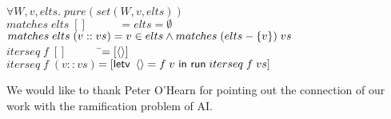 \documentclass[preprint,natbib]{sigplanconf}
\begin{document}
\begin{tabbing}
$\forall W, v, elts.\; pure(set(W,v,elts))$ \\[1em]
  

$matches\;elts\;[] \qquad\;\;\; = elts = \emptyset$ \\
$matches\;elts\;(v :: vs) = v \in elts \land matches\;(elts - \{{v}\})\;vs$\\[1em]

$iterseq\; f\; [] \qquad\;\;\;\;$\=$= [\left<\right>]$ \\
$iterseq\; f\; (v :: vs)$\>$= [\mbox{\textsf{{letv }}}\left<\right> = f\;v\mbox{\textsf{{ in }}}\mbox{\textsf{{run}}}\;iterseq\;f\;vs]$ \\
\end{tabbing}


\acks

We would like to thank Peter O'Hearn for pointing out the connection
of our work with the ramification problem of AI.

{}


% 
% 
% 
% 
\end{document}
